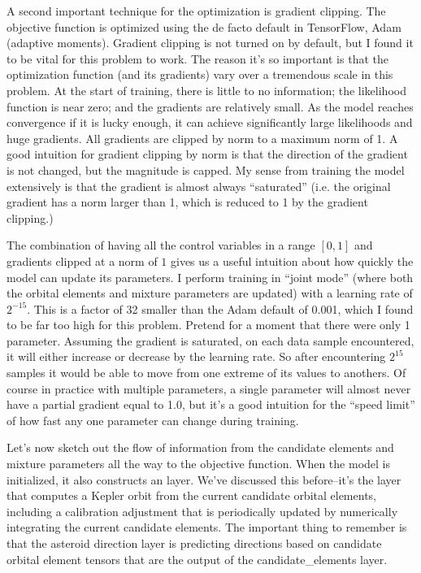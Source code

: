 A second important technique for the optimization is gradient clipping.
The objective function is optimized using the de facto default in TensorFlow, Adam (adaptive moments).
Gradient clipping is not turned on by default, but I found it to be vital for this problem to work.
The reason it's so important is that the optimization function (and its gradients) vary over a tremendous scale in this problem.
At the start of training, there is little to no information; the likelihood function is near zero; and the gradients are relatively small.
As the model reaches convergence if it is lucky enough, it can achieve significantly large likelihoods and huge gradients.
All gradients are clipped by norm to a maximum norm of 1.
A good intuition for gradient clipping by norm is that the direction of the gradient is not changed, but the magnitude is capped.
My sense from training the model extensively is that the gradient is almost always ``saturated'' 
(i.e. the original gradient has a norm larger than 1, which is reduced to 1 by the gradient clipping.)

The combination of having all the control variables in a range $[0, 1]$ and gradients clipped at a norm of $1$
gives us a useful intuition about how quickly the model can update its parameters.
I perform training in ``joint mode'' (where both the orbital elements and mixture parameters are updated) with a learning rate of $2^{-15}$.  
This is a factor of 32 smaller than the Adam default of 0.001, which I found to be far too high for this problem.
Pretend for a moment that there were only 1 parameter.  
Assuming the gradient is saturated, on each data sample encountered, it will either increase or decrease by the learning rate.
So after encountering $2^{15}$ samples it would be able to move from one extreme of its values to anothers.
Of course in practice with multiple parameters, a single parameter will almost never have a partial gradient equal to 1.0,
but it's a good intuition for the ``speed limit'' of how fast any one parameter can change during training.

Let's now sketch out the flow of information from the candidate elements and mixture parameters all the way to the objective function.
When the model is initialized, it also constructs an  layer.
We've discussed this before--it's the layer that computes a Kepler orbit from the current candidate orbital elements,
including a calibration adjustment that is periodically updated by numerically integrating the current candidate elements.
The important thing to remember is that the asteroid direction layer is predicting directions based on candidate orbital element tensors
that are the output of the candidate\_elements layer.

